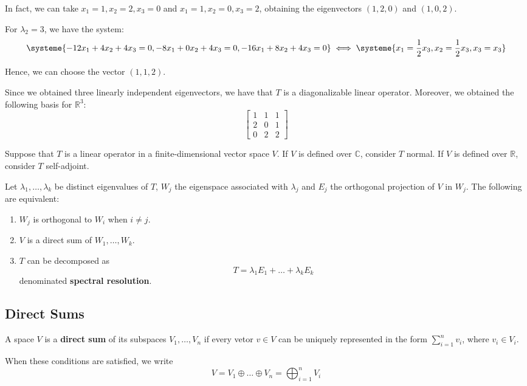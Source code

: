 \begin{example}
	In fact, we can take $x_1 = 1, x_2 = 2, x_3 = 0$ and $x_1 = 1, x_2 = 0, x_3 = 2$, obtaining the eigenvectors $(1,2,0)$ and $(1,0,2)$.

	For $\lambda_2 = 3$, we have the system:
	\[
		\systeme{-12x_1 + 4 x_2 + 4x_3 = 0, -8x_1+0x_2+4x_3 = 0, -16x_1+8x_2+4x_3 = 0} \iff \systeme{x_1 = \frac{1}{2} x_3, x_2 = \frac{1}{2} x_3, x_3 = x_3}
	\]

	Hence, we can choose the vector $(1,1,2)$.

	Since we obtained three linearly independent eigenvectors, we have that $T$ is a diagonalizable linear operator. Moreover, we obtained the following basis for $\mathbb{R}^3$:
	\[
		\begin{bmatrix}
			1 & 1 & 1 \\
			2 & 0 & 1 \\
			0 & 2 & 2
		\end{bmatrix}
	\]
\end{example}

\begin{theorem}
	Suppose that $T$ is a linear operator in a finite-dimensional vector space $V$. If $V$ is defined over $\mathbb{C}$, consider $T$ normal. If $V$ is defined over $\mathbb{R}$, consider $T$ self-adjoint.

	Let $\lambda_1, \ldots, \lambda_k$ be distinct eigenvalues of $T$, $W_j$ the eigenspace associated with $\lambda_j$ and $E_j$ the orthogonal projection of $V$ in $W_j$. The following are equivalent:
	\begin{enumerate}
	\item $W_j$ is orthogonal to $W_i$ when $i \neq j$.
	\item $V$ is a direct sum of $W_1, \ldots, W_k$.
	\item $T$ can be decomposed as \[T = \lambda_1 E_1 + \ldots + \lambda_k E_k\] denominated \textbf{spectral resolution}.
	\end{enumerate}
\end{theorem}

\subsection*{Direct Sums}

\begin{definition}
	A space $V$ is a \textbf{direct sum} of its subspaces $V_1, \ldots, V_n$ if every vetor $v \in V$ can be uniquely represented in the form $\sum_{i=1}^n v_i$, where $v_i \in V_i$.

	When these conditions are satisfied, we write
	\[
		V = V_1 \oplus \ldots \oplus V_n = \bigoplus_{i=1}^n V_i
	\]
\end{definition}

